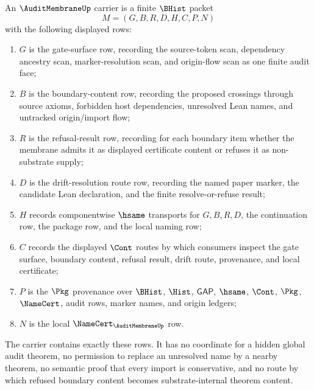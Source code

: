 \begin{definition}
\label{def:audit-membrane-carrier}
An $\AuditMembraneUp$ carrier is a finite $\BHist$ packet
$$
M=(G,B,R,D,H,C,P,N)
$$
with the following displayed rows:
\begin{enumerate}
\item $G$ is the gate-surface row, recording the source-token scan, dependency ancestry scan, marker-resolution scan, and origin-flow scan as one finite audit face;
\item $B$ is the boundary-content row, recording the proposed crossings through source axioms, forbidden host dependencies, unresolved Lean names, and untracked origin/import flow;
\item $R$ is the refusal-result row, recording for each boundary item whether the membrane admits it as displayed certificate content or refuses it as non-substrate supply;
\item $D$ is the drift-resolution route row, recording the named paper marker, the candidate Lean declaration, and the finite resolve-or-refuse result;
\item $H$ records componentwise $\hsame$ transports for $G,B,R,D$, the continuation row, the package row, and the local naming row;
\item $C$ records the displayed $\Cont$ routes by which consumers inspect the gate surface, boundary content, refusal result, drift route, provenance, and local certificate;
\item $P$ is the $\Pkg$ provenance over $\BHist$, $\Hist$, $\mathsf{GAP}$, $\hsame$, $\Cont$, $\Pkg$, $\NameCert$, audit rows, marker names, and origin ledgers;
\item $N$ is the local $\NameCert_{\AuditMembraneUp}$ row.
\end{enumerate}
The carrier contains exactly these rows. It has no coordinate for a hidden global audit theorem, no permission to replace an unresolved name by a nearby theorem, no semantic proof that every import is conservative, and no route by which refused boundary content becomes substrate-internal theorem content.
\end{definition}

